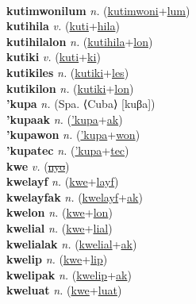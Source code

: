  \label{kutimwonilon} \\
\textbf{kutimwonilum} \textit{n.} (\hyperref[kutimwoni]{kutimwoni}+\hyperref[lum]{lum})
 \label{kutimwonilum} \\
\textbf{kutihila} \textit{v.} (\hyperref[kuti]{kuti}+\hyperref[hila]{hila})
 \label{kutihila} \\
\textbf{kutihilalon} \textit{n.} (\hyperref[kutihila]{kutihila}+\hyperref[lon]{lon})
 \label{kutihilalon} \\
\textbf{kutiki} \textit{v.} (\hyperref[kuti]{kuti}+\hyperref[ki]{ki})
 \label{kutiki} \\
\textbf{kutikiles} \textit{n.} (\hyperref[kutiki]{kutiki}+\hyperref[les]{les})
 \label{kutikiles} \\
\textbf{kutikilon} \textit{n.} (\hyperref[kutiki]{kutiki}+\hyperref[lon]{lon})
 \label{kutikilon} \\
\textbf{'kupa} \textit{n.} (Spa. ⟨Cuba⟩ [kuβa])
 \label{'kupa} \\
\textbf{'kupaak} \textit{n.} (\hyperref['kupa]{'kupa}+\hyperref[ak]{ak})
 \label{'kupaak} \\
\textbf{'kupawon} \textit{n.} (\hyperref['kupa]{'kupa}+\hyperref[won]{won})
 \label{'kupawon} \\
\textbf{'kupatec} \textit{n.} (\hyperref['kupa]{'kupa}+\hyperref[tec]{tec})
 \label{'kupatec} \\
\textbf{kwe} \textit{v.} (\hyperref[nyo]{\sout{nyo}})
 \label{kwe} \\
\textbf{kwelayf} \textit{n.} (\hyperref[kwe]{kwe}+\hyperref[layf]{layf})
 \label{kwelayf} \\
\textbf{kwelayfak} \textit{n.} (\hyperref[kwelayf]{kwelayf}+\hyperref[ak]{ak})
 \label{kwelayfak} \\
\textbf{kwelon} \textit{n.} (\hyperref[kwe]{kwe}+\hyperref[lon]{lon})
 \label{kwelon} \\
\textbf{kwelial} \textit{n.} (\hyperref[kwe]{kwe}+\hyperref[lial]{lial})
 \label{kwelial} \\
\textbf{kwelialak} \textit{n.} (\hyperref[kwelial]{kwelial}+\hyperref[ak]{ak})
 \label{kwelialak} \\
\textbf{kwelip} \textit{n.} (\hyperref[kwe]{kwe}+\hyperref[lip]{lip})
 \label{kwelip} \\
\textbf{kwelipak} \textit{n.} (\hyperref[kwelip]{kwelip}+\hyperref[ak]{ak})
 \label{kwelipak} \\
\textbf{kweluat} \textit{n.} (\hyperref[kwe]{kwe}+\hyperref[luat]{luat})
 \label{kweluat} \\
